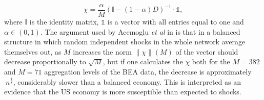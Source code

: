 \begin{equation}
  \label{eq:centrality}
  \chi = \frac{\alpha}{M}(\mathds{I} - (1-\alpha) D)^{-1}\cdot \mathds{1},
\end{equation}
where $\mathds{I}$ is the identity matrix, $\mathds{1}$ is a vector
with all entries equal to one and $\alpha \in (0,1)$. The argument
used by Acemoglu \emph{et al} in \cite{Acemoglu12} is that in a
balanced structure in which random independent shocks in the whole
network average themselves out, as $M$ increases the norm
$\|\chi\| (M)$ of the vector should decrease proportionally to $\sqrt{M}$, but if
one calculates the $\chi$ both for the $M=382$ and $M=71$ aggregation
levels of the BEA data, the decrease is approximately
$~n^{\frac{1}{8}}$, considerably slower than a balanced economy. This
is interpreted as an evidence that the US economy is more susceptible
than expected to shocks.

